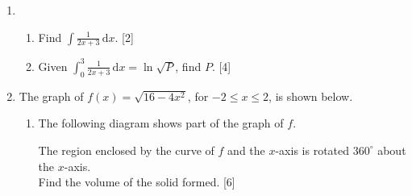 \documentclass[12pt, twoside]{article}
\begin{document}
\begin{enumerate}
\item
\begin{enumerate}
    \item Find $\displaystyle \int \frac{1}{2x+3} \,\mathrm{d}x$. \hfill [2]
    \item Given $\displaystyle \int_0^3 \frac{1}{2x+3} \,\mathrm{d}x =\ln \sqrt{P}$, find $P$. \hfill [4]
\end{enumerate}


\newpage
\item The graph of $f(x)=\sqrt{16-4x^2}$, for $-2 \leq x \leq 2$, is shown below.
  \begin{enumerate}
    \item The following diagram shows part of the graph of $f$.
      \begin{center}
      \end{center}
    The region enclosed by the curve of $f$ and the $x$-axis is rotated $360^\circ$ about the $x$-axis.\\
    Find the volume of the solid formed.  \hfill [6]
  \end{enumerate}



\end{enumerate}
\end{document}
